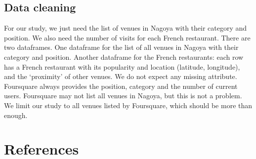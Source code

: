 \documentclass[12pt,a4paper]{article}
\begin{document}
\subsection{Data cleaning}

For our study, we just need the list of venues in Nagoya with their category and position. We also need the number of visits for each French restaurant. There are two dataframes. One dataframe for the list of all venues in Nagoya with their category and position. Another dataframe for the French restaurants: each row has a French restaurant with its popularity and location (latitude, longitude), and the ‘proximity’ of other venues. 
	We do not expect any missing attribute. Foursquare always provides the position, category and the number of current users. Foursquare may not list all venues in Nagoya, but this is not a problem. We limit our study to all venues listed by Foursquare, which should be more than enough.
	


\section*{References}
\end{document}
